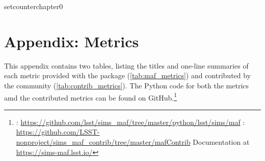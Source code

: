 setcounter{chapter}{0}
\chapter*{Appendix: \MAF Metrics}
\def\chpname{metrics}\label{chp:\chpname}
\markboth{}{}

This appendix contains two tables, listing the titles and one-line summaries of each metric provided with the \MAF package (\autoref{tab:maf_metrics}) and contributed by the community (\autoref{tab:contrib_metrics}). The Python code for both the \MAF metrics amd the contributed metrics can be found on GitHub.\footnote{\MAF: \url{https://github.com/lsst/sims_maf/tree/master/python/lsst/sims/maf}
\newline\noindent{}: \url{https://github.com/LSST-nonproject/sims\_maf\_contrib/tree/master/mafContrib}
\newline\noindent Documentation at \url{ https://sims-maf.lsst.io/}}




